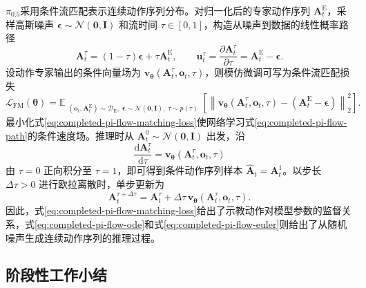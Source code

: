 \(\pi_{0.5}\)采用条件流匹配表示连续动作序列分布\cite{black2024pi0,black2025pi05}。对归一化后的专家动作序列 \(\mathbf A_t^{\mathrm E}\)，采样高斯噪声 \(\boldsymbol\epsilon\sim\mathcal N(\mathbf 0,\mathbf I)\) 和流时间 \(\tau\in[0,1]\)，构造从噪声到数据的线性概率路径
\begin{equation}
  \mathbf A_t^{\tau}
  =
  (1-\tau)\boldsymbol\epsilon
  +
  \tau\mathbf A_t^{\mathrm E},
  \qquad
  \mathbf u_t^{\tau}
  =
  \frac{\partial\mathbf A_t^{\tau}}{\partial\tau}
  =
  \mathbf A_t^{\mathrm E}-\boldsymbol\epsilon.
  \label{eq:completed-pi-flow-path}
\end{equation}
设动作专家输出的条件向量场为
\(\mathbf v_{\boldsymbol\theta}(\mathbf A_t^{\tau},\mathbf o_t,\tau)\)，则模仿微调可写为条件流匹配损失
\begin{equation}
  \mathcal L_{\mathrm{FM}}(\boldsymbol\theta)
  =
  \mathbb E_{\substack{
    (\mathbf o_t,\mathbf A_t^{\mathrm E})\sim\mathcal D_{\mathrm E},\;
    \boldsymbol\epsilon\sim\mathcal N(\mathbf 0,\mathbf I),\;
    \tau\sim p(\tau)}}
  \left[
    \left\|
      \mathbf v_{\boldsymbol\theta}
      (\mathbf A_t^{\tau},\mathbf o_t,\tau)
      -
      (\mathbf A_t^{\mathrm E}-\boldsymbol\epsilon)
    \right\|_2^2
  \right].
  \label{eq:completed-pi-flow-matching-loss}
\end{equation}
最小化式\eqref{eq:completed-pi-flow-matching-loss}使网络学习式\eqref{eq:completed-pi-flow-path}的条件速度场。推理时从
\(\mathbf A_t^{0}\sim\mathcal N(\mathbf 0,\mathbf I)\) 出发，沿
\begin{equation}
  \frac{\mathrm d\mathbf A_t^{\tau}}{\mathrm d\tau}
  =
  \mathbf v_{\boldsymbol\theta}
  (\mathbf A_t^{\tau},\mathbf o_t,\tau)
  \label{eq:completed-pi-flow-ode}
\end{equation}
由 \(\tau=0\) 正向积分至 \(\tau=1\)，即可得到条件动作序列样本
\(\widehat{\mathbf A}_t=\mathbf A_t^1\)。以步长 \(\Delta\tau>0\) 进行欧拉离散时，单步更新为
\begin{equation}
  \mathbf A_t^{\tau+\Delta\tau}
  =
  \mathbf A_t^{\tau}
  +
  \Delta\tau\,
  \mathbf v_{\boldsymbol\theta}
  (\mathbf A_t^{\tau},\mathbf o_t,\tau).
  \label{eq:completed-pi-flow-euler}
\end{equation}
因此，式\eqref{eq:completed-pi-flow-matching-loss}给出了示教动作对模型参数的监督关系，式\eqref{eq:completed-pi-flow-ode}和式\eqref{eq:completed-pi-flow-euler}则给出了从随机噪声生成连续动作序列的推理过程。

\subsection{阶段性工作小结}


